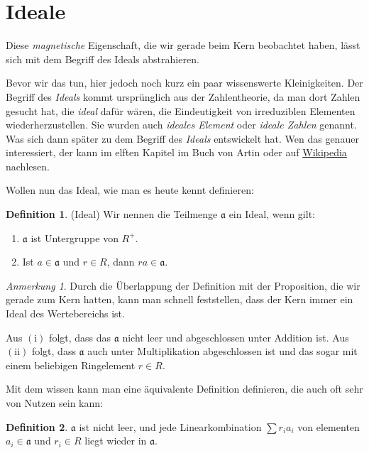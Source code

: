 \documentclass{article}
\theoremstyle{definition}
\newtheorem*{definition}{Definition}
\theoremstyle{remark}
\newtheorem*{anm}{Anmerkung}
\begin{document}
\newpage
\section{Ideale}
Diese \emph{magnetische} Eigenschaft, die wir gerade beim Kern beobachtet haben, lässt sich mit dem Begriff
des Ideals abstrahieren.

\vspace{0.7em}
Bevor wir das tun, hier jedoch noch kurz ein paar wissenswerte Kleinigkeiten. Der Begriff des \emph{Ideals}
kommt ursprünglich aus der Zahlentheorie, da man dort Zahlen gesucht hat, die \emph{ideal} dafür wären, die
Eindeutigkeit von irreduziblen Elementen wiederherzustellen. Sie wurden auch \emph{ideales Element} oder
\emph{ideale Zahlen} genannt. Was sich dann später zu dem Begriff des \emph{Ideals} entswickelt hat. Wen das
genauer interessiert, der kann im elften Kapitel im Buch von Artin oder auf
\href{https://de.wikipedia.org/wiki/Ideal_(Ringtheorie)#%E2%80%9EIdeale_Zahlen%E2%80%9C}{Wikipedia} nachlesen.

\vspace{0.7em}
Wollen nun das Ideal, wie man es heute kennt definieren:

\begin{definition}(Ideal) Wir nennen die Teilmenge $\mathfrak a$ ein Ideal, wenn gilt:
\begin{enumerate}[label=(\roman*)]
    \item $\mathfrak a$ ist Untergruppe von $R^+$.
    \item Ist $a \in \mathfrak a$ und $r\in R$, dann $ra \in \mathfrak a$.
\end{enumerate}
\end{definition}

\begin{anm}
Durch die Überlappung der Definition mit der Proposition, die wir gerade zum Kern hatten, kann man schnell
feststellen, dass der Kern immer ein Ideal des Wertebereichs ist.
\end{anm}

Aus $(\mathrm i)$ folgt, dass das $\mathfrak a$ nicht leer und abgeschlossen unter Addition ist. Aus
$(\mathrm{ii})$ folgt, dass $\mathfrak a$ auch unter Multiplikation abgeschlossen ist und das sogar mit einem
beliebigen Ringelement $r\in R$.

\vspace{0.7em}
Mit dem wissen kann man eine äquivalente Definition definieren, die auch oft sehr von Nutzen sein kann:

\begin{definition}
$\mathfrak a$ ist nicht leer, und jede Linearkombination $\sum r_i a_i$ von elementen $a_i\in \mathfrak a$ und
    $r_i\in R$ liegt wieder in $\mathfrak a$.
\end{definition}
\end{document}
